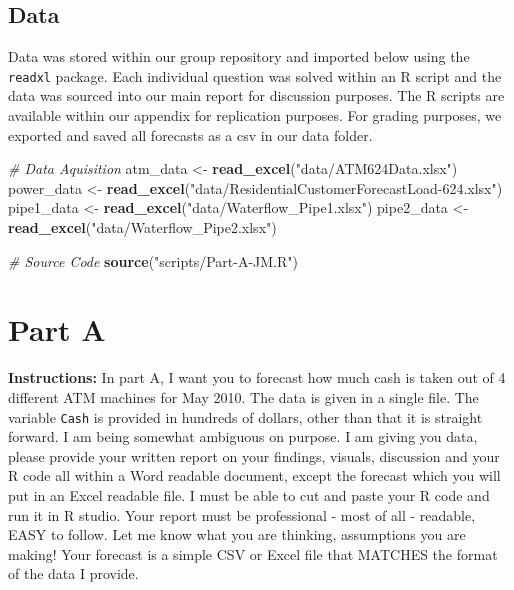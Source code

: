 \documentclass[openany]{book}
\newenvironment{Shaded}{\begin{snugshade}}{\end{snugshade}}
\newcommand{\CommentTok}[1]{\textcolor[rgb]{0.56,0.35,0.01}{\textit{#1}}}
\newcommand{\KeywordTok}[1]{\textcolor[rgb]{0.13,0.29,0.53}{\textbf{#1}}}
\newcommand{\NormalTok}[1]{#1}
\newcommand{\StringTok}[1]{\textcolor[rgb]{0.31,0.60,0.02}{#1}}
\renewenvironment{quote}{\begin{myquote}}{\end{myquote}}
\begin{document}
\hypertarget{data}{%
\section*{Data}\label{data}}

Data was stored within our group repository and imported below using the
\texttt{readxl} package. Each individual question was solved within an R
script and the data was sourced into our main report for discussion
purposes. The R scripts are available within our appendix for
replication purposes. For grading purposes, we exported and saved all
forecasts as a csv in our data folder.

\begin{Shaded}
\begin{Highlighting}[]
\CommentTok{# Data Aquisition}
\NormalTok{atm_data <-}\StringTok{ }\KeywordTok{read_excel}\NormalTok{(}\StringTok{"data/ATM624Data.xlsx"}\NormalTok{) }
\NormalTok{power_data <-}\StringTok{ }\KeywordTok{read_excel}\NormalTok{(}\StringTok{"data/ResidentialCustomerForecastLoad-624.xlsx"}\NormalTok{) }
\NormalTok{pipe1_data <-}\StringTok{ }\KeywordTok{read_excel}\NormalTok{(}\StringTok{"data/Waterflow_Pipe1.xlsx"}\NormalTok{)}
\NormalTok{pipe2_data <-}\StringTok{ }\KeywordTok{read_excel}\NormalTok{(}\StringTok{"data/Waterflow_Pipe2.xlsx"}\NormalTok{)}

\CommentTok{# Source Code}
\KeywordTok{source}\NormalTok{(}\StringTok{"scripts/Part-A-JM.R"}\NormalTok{)}
\end{Highlighting}
\end{Shaded}

\hypertarget{part-a}{%
\chapter{Part A}\label{part-a}}

\begin{quote}
\textbf{Instructions:} In part A, I want you to forecast how much cash
is taken out of 4 different ATM machines for May 2010. The data is given
in a single file. The variable \texttt{Cash} is provided in hundreds of
dollars, other than that it is straight forward. I am being somewhat
ambiguous on purpose. I am giving you data, please provide your written
report on your findings, visuals, discussion and your R code all within
a Word readable document, except the forecast which you will put in an
Excel readable file. I must be able to cut and paste your R code and run
it in R studio. Your report must be professional - most of all -
readable, EASY to follow. Let me know what you are thinking, assumptions
you are making! Your forecast is a simple CSV or Excel file that MATCHES
the format of the data I provide.
\end{quote}
\end{document}
